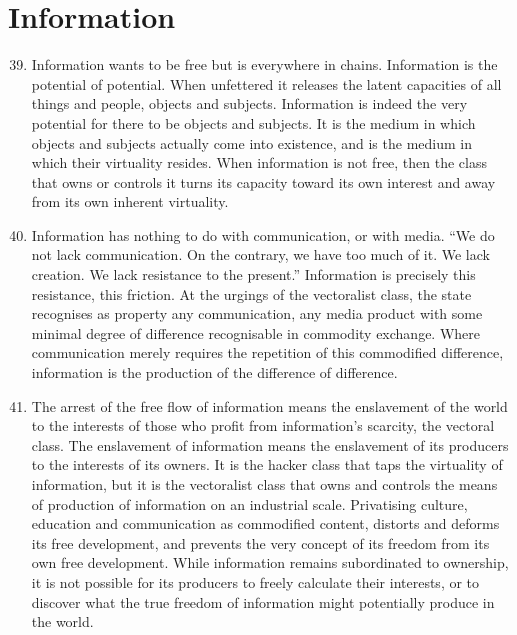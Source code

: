 \documentclass[letterpaper,12pt,english]{sphinxmanual}
\begin{document}
\section{Information}
\label{wark:information}\begin{enumerate}
\setcounter{enumi}{38}
\item {} 
Information wants to be free but is everywhere in chains. Information is the potential of potential. When unfettered it releases the latent capacities of all things and people, objects and subjects. Information is indeed the very potential for there to be objects and subjects. It is the medium in which objects and subjects actually come into existence, and is the medium in which their virtuality resides. When information is not free, then the class that owns or controls it turns its capacity toward its own interest and away from its own inherent virtuality.

\item {} 
Information has nothing to do with communication, or with media. ``We do not lack communication. On the contrary, we have too much of it. We lack creation. We lack resistance to the present.'' Information is precisely this resistance, this friction. At the urgings of the vectoralist class, the state recognises as property any communication, any media product with some minimal degree of difference recognisable in commodity exchange. Where communication merely requires the repetition of this commodified difference, information is the production of the difference of difference.

\item {} 
The arrest of the free flow of information means the enslavement of the world to the interests of those who profit from information's scarcity, the vectoral class. The enslavement of information means the enslavement of its producers to the interests of its owners. It is the hacker class that taps the virtuality of information, but it is the vectoralist class that owns and controls the means of production of information on an industrial scale. Privatising culture, education and communication as commodified content, distorts and deforms its free development, and prevents the very concept of its freedom from its own free development. While information remains subordinated to ownership, it is not possible for its producers to freely calculate their interests, or to discover what the true freedom of information might potentially produce in the world.


\end{enumerate}
\end{document}
